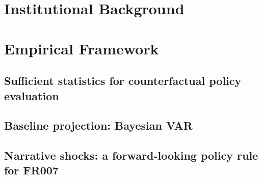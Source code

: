 \documentclass[12pt, a4paper]{article}
\begin{document}
\section{Institutional Background}\label{sec:institutional}


\section{Empirical Framework}\label{sec:framework}


\subsection{Sufficient statistics for counterfactual policy evaluation}


\subsection{Baseline projection: Bayesian VAR}


\subsection{Narrative shocks: a forward-looking policy rule for FR007}
\end{document}
